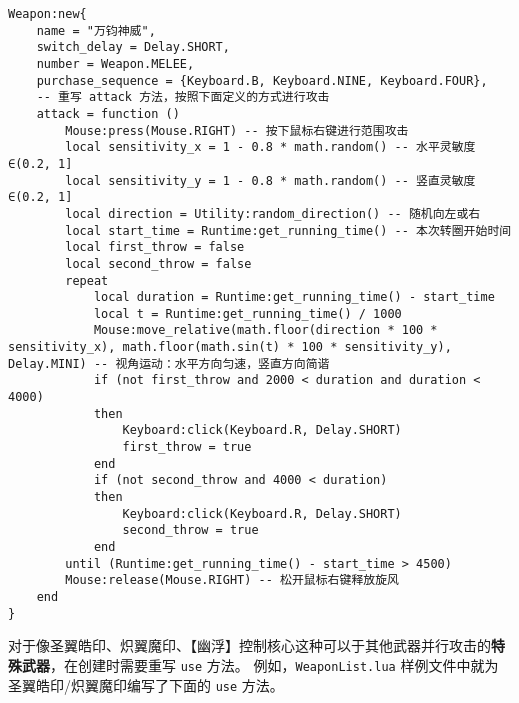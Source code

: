 \begin{verbatim}
Weapon:new{
    name = "万钧神威",
    switch_delay = Delay.SHORT,
    number = Weapon.MELEE,
    purchase_sequence = {Keyboard.B, Keyboard.NINE, Keyboard.FOUR},
    -- 重写 attack 方法，按照下面定义的方式进行攻击
    attack = function ()
        Mouse:press(Mouse.RIGHT) -- 按下鼠标右键进行范围攻击
        local sensitivity_x = 1 - 0.8 * math.random() -- 水平灵敏度∈(0.2, 1]
        local sensitivity_y = 1 - 0.8 * math.random() -- 竖直灵敏度∈(0.2, 1]
        local direction = Utility:random_direction() -- 随机向左或右
        local start_time = Runtime:get_running_time() -- 本次转圈开始时间
        local first_throw = false
        local second_throw = false
        repeat
            local duration = Runtime:get_running_time() - start_time
            local t = Runtime:get_running_time() / 1000
            Mouse:move_relative(math.floor(direction * 100 * sensitivity_x), math.floor(math.sin(t) * 100 * sensitivity_y), Delay.MINI) -- 视角运动：水平方向匀速，竖直方向简谐
            if (not first_throw and 2000 < duration and duration < 4000)
            then
                Keyboard:click(Keyboard.R, Delay.SHORT)
                first_throw = true
            end
            if (not second_throw and 4000 < duration)
            then
                Keyboard:click(Keyboard.R, Delay.SHORT)
                second_throw = true
            end
        until (Runtime:get_running_time() - start_time > 4500)
        Mouse:release(Mouse.RIGHT) -- 松开鼠标右键释放旋风
    end
}
\end{verbatim}

对于像圣翼皓印、炽翼魔印、【幽浮】控制核心这种可以于其他武器并行攻击的\textbf{特殊武器}，在创建时需要重写 \lstinline{use} 方法。
例如，\lstinline{WeaponList.lua} 样例文件中就为圣翼皓印/炽翼魔印编写了下面的 \lstinline{use} 方法。


